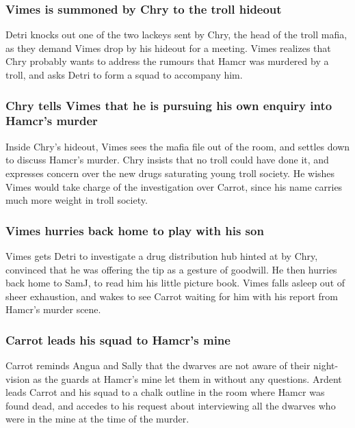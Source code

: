 \subsubsection{\Gls{Vimes} is summoned by \Gls{Chry} to the troll hideout}
\Gls{Detri} knocks out one of the two lackeys sent by \Gls{Chry}, the head of the troll mafia, as
they demand \Gls{Vimes} drop by his hideout for a meeting. \Gls{Vimes} realizes that \Gls{Chry}
probably wants to address the rumours that \Gls{Hamcr} was murdered by a troll, and asks \Gls{Detri}
to form a squad to accompany him.

\subsubsection{\Gls{Chry} tells \Gls{Vimes} that he is pursuing his own enquiry into \Gls{Hamcr}'s
    murder}
Inside \Gls{Chry}'s hideout, \Gls{Vimes} sees the mafia file out of the room, and settles down to
discuss \Gls{Hamcr}'s murder. \Gls{Chry} insists that no troll could have done it, and expresses
concern over the new drugs saturating young troll society. He wishes \Gls{Vimes} would take charge
of the investigation over \Gls{Carrot}, since his name carries much more weight in troll society.

\subsubsection{\Gls{Vimes} hurries back home to play with his son}
\Gls{Vimes} gets \Gls{Detri} to investigate a drug distribution hub hinted at by \Gls{Chry},
convinced that he was offering the tip as a gesture of goodwill. He then hurries back home to
\Gls{SamJ}, to read him his little picture book. \Gls{Vimes} falls asleep out of sheer exhaustion,
and wakes to see \Gls{Carrot} waiting for him with his report from \Gls{Hamcr}'s murder scene.

\subsubsection{\Gls{Carrot} leads his squad to \Gls{Hamcr}'s mine}
\Gls{Carrot} reminds \Gls{Angua} and \Gls{Sally} that the dwarves are not aware of their
night-vision as the guards at \Gls{Hamcr}'s mine let them in without any questions. \Gls{Ardent}
leads \Gls{Carrot} and his squad to a chalk outline in the room where \Gls{Hamcr} was found dead,
and accedes to his request about interviewing all the dwarves who were in the mine at the time of
the murder.

